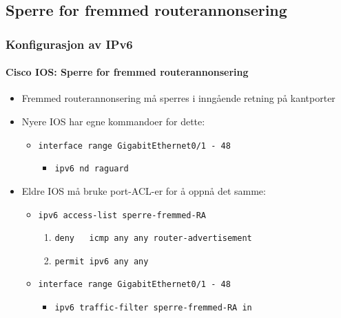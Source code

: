 \subsection{Sperre for fremmed routerannonsering}
\begin{frame}%
  \frametitle{Konfigurasjon av IPv6}
  \framesubtitle{Cisco IOS: Sperre for fremmed routerannonsering}
  \pause
  \begin{itemize}[<+->]
  \item Fremmed routerannonsering må sperres i inngående retning på
    kantporter
  \item Nyere IOS har egne kommandoer for dette:
    \begin{itemize}[<+->]
    \item \texttt{interface range GigabitEthernet0/1 - 48}
      \begin{itemize}[<+->]
      \item \texttt{ipv6 nd raguard}
      \end{itemize}
    \end{itemize}
  \item Eldre IOS må bruke port-ACL-er for å oppnå det samme:
    \begin{itemize}[<+->]
    \item \texttt{ipv6 access-list sperre-fremmed-RA}
      \begin{enumerate}[<+->]
      \item \texttt{deny\ \ \ icmp any any router-advertisement}
      \item \texttt{permit    ipv6 any any}
      \end{enumerate}
    \item \texttt{interface range GigabitEthernet0/1 - 48}
      \begin{itemize}[<+->]
      \item \texttt{ipv6 traffic-filter sperre-fremmed-RA in}
      \end{itemize}
    \end{itemize}
  \end{itemize}
\end{frame}

